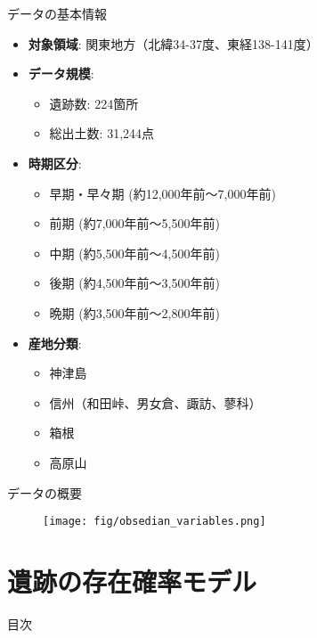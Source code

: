 \documentclass[xelatex, 8pt]{beamer}
\theoremstyle{plain}
\theoremstyle{definition}
\begin{document}
\begin{frame}{データの基本情報}
    \begin{itemize}
        \item \textbf{対象領域}: 関東地方（北緯34-37度、東経138-141度）
        \item \textbf{データ規模}:
        \begin{itemize}
            \item 遺跡数: 224箇所
            \item 総出土数: 31,244点
        \end{itemize}
        \vspace{2mm}
        \item \textbf{時期区分}:
        \begin{itemize}
            \item 早期・早々期 (約12,000年前〜7,000年前)
            \item 前期 (約7,000年前〜5,500年前)
            \item 中期 (約5,500年前〜4,500年前)
            \item 後期 (約4,500年前〜3,500年前)
            \item 晩期 (約3,500年前〜2,800年前)
        \end{itemize}
        \vspace{2mm}
        \item \textbf{産地分類}:
        \begin{itemize}
            \item 神津島
            \item 信州（和田峠、男女倉、諏訪、蓼科）
            \item 箱根
            \item 高原山
        \end{itemize}
    \end{itemize}
\end{frame}

\begin{frame}{データの概要}
    \begin{figure}
        \centering
        \texttt{[image: fig/obsedian\_variables.png]}
        \label{fig:enter-label}
    \end{figure}
\end{frame}


\section{遺跡の存在確率モデル}
\begin{frame}
{\Large 目次}
 \tableofcontents[currentsection]
\end{frame}
\end{document}
